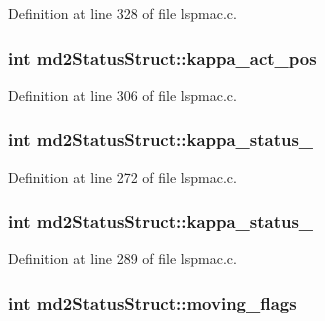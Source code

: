 Definition at line 328 of file lspmac.\-c.

\hypertarget{structmd2StatusStruct_ac384fb7073387dd5dcb2e85a00ec8a77}{
\subsubsection[{kappa\-\_\-act\-\_\-pos}]{\setlength{\rightskip}{0pt plus 5cm}int md2\-Status\-Struct\-::kappa\-\_\-act\-\_\-pos}}\label{structmd2StatusStruct_ac384fb7073387dd5dcb2e85a00ec8a77}


Definition at line 306 of file lspmac.\-c.

\hypertarget{structmd2StatusStruct_ab152694bc32d37c1d180f55e8d282020}{
\subsubsection[{kappa\-\_\-status\-\_\-1}]{\setlength{\rightskip}{0pt plus 5cm}int md2\-Status\-Struct\-::kappa\-\_\-status\-\_}}\label{structmd2StatusStruct_ab152694bc32d37c1d180f55e8d282020}


Definition at line 272 of file lspmac.\-c.

\hypertarget{structmd2StatusStruct_af6891f5f8dcfc62668f64c583042c6bc}{
\subsubsection[{kappa\-\_\-status\-\_\-2}]{\setlength{\rightskip}{0pt plus 5cm}int md2\-Status\-Struct\-::kappa\-\_\-status\-\_}}\label{structmd2StatusStruct_af6891f5f8dcfc62668f64c583042c6bc}


Definition at line 289 of file lspmac.\-c.

\hypertarget{structmd2StatusStruct_aac82f8e97fa39ea9be7823dd1d308986}{
\subsubsection[{moving\-\_\-flags}]{\setlength{\rightskip}{0pt plus 5cm}int md2\-Status\-Struct\-::moving\-\_\-flags}}\label{structmd2StatusStruct_aac82f8e97fa39ea9be7823dd1d308986}


